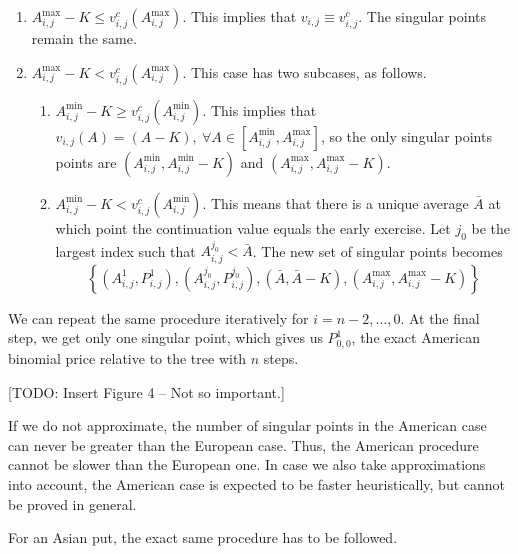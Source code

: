 \begin{enumerate}
	\item $ A_{i,j}^{\max} - K  \le  v_{i,j}^c ( A_{i,j}^{\max} ) $. This implies that $ v_{i,j} \equiv v_{i,j}^c $. The singular points remain the same.
	\item $ A_{i,j}^{\max} - K  <  v_{i,j}^c ( A_{i,j}^{\max} ) $. This case has two subcases, as follows.
	\begin{enumerate}
		\item $ A_{i,j}^{\min} - K  \ge  v_{i,j}^c ( A_{i,j}^{\min} ) $. This implies that $ v_{i,j} (A) = (A - K), \  \forall A \in [ A_{i,j}^{\min}, A_{i,j}^{\max} ] $, so the only singular points points are $ \left(  A_{i,j}^{\min}, A_{i,j}^{\min} - K  \right) $ and $ \left(  A_{i,j}^{\max}, A_{i,j}^{\max} - K  \right) $.
		\item $ A_{i,j}^{\min} - K  <  v_{i,j}^c ( A_{i,j}^{\min} ) $. This means that there is a unique average $ \bar{A} $ at which point the continuation value equals the early exercise. Let $ j_0 $ be the largest index such that $ A_{i,j}^{j_0} < \bar{A} $. The new set of singular points becomes
		\begin{equation*}
			\left\lbrace  \left( A_{i,j}^{1}, P_{i,j}^{1} \right), \left( A_{i,j}^{j_0}, P_{i,j}^{j_0} \right), \left( \bar{A}, \bar{A} - K \right), \left( A_{i,j}^{\max}, A_{i,j}^{\max} - K \right)  \right\rbrace
		\end{equation*}
	\end{enumerate}
\end{enumerate}

We can repeat the same procedure iteratively for $ i = n-2, \dots, 0 $. At the final step, we get only one singular point, which gives us $ P_{0,0}^1 $, the exact American binomial price relative to the tree with $ n $ steps.

[TODO: Insert Figure 4 -- Not so important.]


\begin{rem}
	If we do not approximate, the number of singular points in the American case can never be greater than the European case. Thus, the American procedure cannot be slower than the European one. In case we also take approximations into account, the American case is expected to be faster heuristically, but cannot be proved in general.
\end{rem}

\begin{rem}[Put]
	For an Asian put, the exact same procedure has to be followed.
\end{rem}

